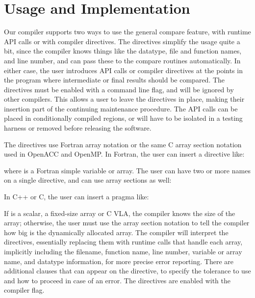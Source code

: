 \section{Usage and Implementation}

Our compiler supports two ways to use the general compare feature, with runtime API calls or with compiler directives.
The directives simplify the usage quite a bit, since the compiler knows things like the datatype, file and function names, and line number, and can pass these to the compare routines automatically.
In either case, the user introduces API calls or compiler directives at the points in the program where intermediate or final results should be compared.
The directives must be enabled with a command line flag, and will be ignored by other compilers.
This allows a user to leave the directives in place, making their insertion part of the continuing maintenance procedure.
The API calls can be placed in conditionally compiled regions, or will have to be isolated in a testing harness or removed before releasing the software.

The directives use Fortran array notation or the same C array section notation used in OpenACC and OpenMP.
In Fortran, the user can insert a directive like:
\begin{otabbing}
\>
\end{otabbing}
where  is a Fortran simple variable or array.
The user can have two or more names on a single directive, and can use array sections as well:
\begin{otabbing}
\>
\end{otabbing}
In C++ or C, the user can insert a pragma like:
\begin{otabbing}
\>
\end{otabbing}
If  is a scalar, a fixed-size array or C VLA, the compiler knows the size of the array; otherwise, the user must use the array section notation to tell the compiler how big is the dynamically allocated array.
The compiler will interpret the directives, essentially replacing them with runtime calls that handle each array, implicitly including the filename, function name, line number, variable or array name, and datatype information, for more precise error reporting.
There are additional clauses that can appear on the directive, to specify the tolerance to use and how to proceed in case of an error.
The directives are enabled with the  compiler flag.

